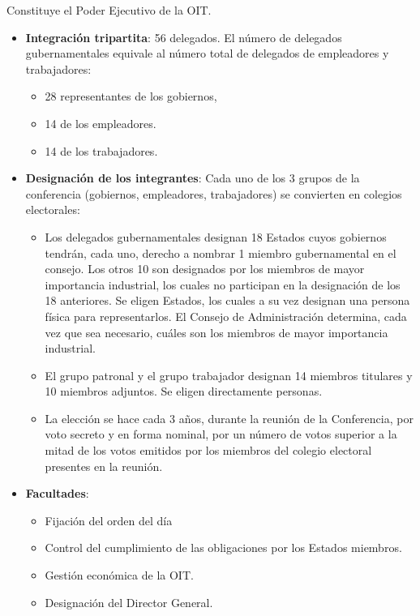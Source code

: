 \documentclass[spanish,12pt,a4paper,titlepage]{report}
\begin{document}
Constituye el Poder Ejecutivo de la OIT.

\begin{itemize}
\item \textbf{Integración tripartita}: 56 delegados. El número de delegados gubernamentales equivale al número total de delegados de empleadores y trabajadores:
  \begin{itemize}
  \item 28 representantes de los gobiernos, 
  \item 14 de los empleadores.
  \item 14 de los trabajadores.
  \end{itemize}
\item \textbf{Designación de los integrantes}: Cada uno de los 3 grupos de la conferencia (gobiernos, empleadores, trabajadores) se convierten en colegios electorales:
  \begin{itemize}
  \item Los delegados gubernamentales designan 18 Estados cuyos gobiernos tendrán, cada uno, derecho a nombrar 1 miembro gubernamental en el consejo. Los otros 10 son designados por los miembros de mayor importancia industrial, los cuales no participan en la designación de los 18 anteriores. Se eligen Estados, los cuales a su vez designan una persona física para representarlos. El Consejo de Administración determina, cada vez que sea necesario, cuáles son los miembros de mayor importancia industrial.
  \item El grupo patronal y el grupo trabajador designan 14 miembros titulares y 10 miembros adjuntos. Se eligen directamente personas.
  \item La elección se hace cada 3 años, durante la reunión de la Conferencia, por voto secreto y en forma nominal, por un número de votos superior a la mitad de los votos emitidos por los miembros del colegio electoral presentes en la reunión.
  \end{itemize}
\item \textbf{Facultades}: 
  \begin{itemize}
  \item Fijación del orden del día
  \item Control del cumplimiento de las obligaciones por los Estados miembros.
  \item Gestión económica de la OIT.
  \item Designación del Director General.
  \end{itemize}
\end{itemize}
\end{document}
